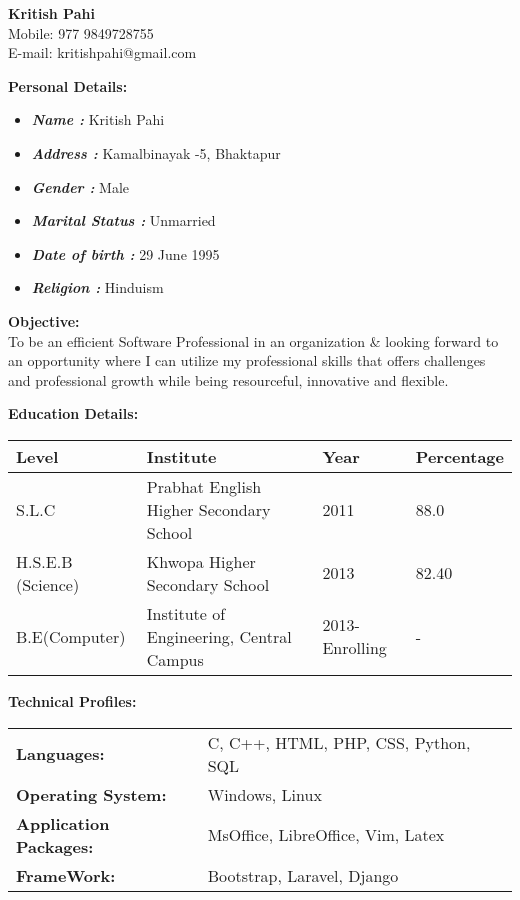 \documentclass[paper = a4paper, 12pt]{article}
\begin{document}
\pagestyle{empty}

{\Huge
	\textbf{Kritish Pahi} \\
	\small{Mobile: 977 9849728755}\\
	\small{E-mail: kritishpahi@gmail.com}\\

	
}

{ \Large \textbf{Personal Details:}\\
}
\begin{itemize}\addtolength{\leftskip}{8mm}

	\item \textbf{\emph{Name :}} Kritish Pahi
	\item \textbf{\emph{Address :}} Kamalbinayak -5, Bhaktapur
	\item \textbf{\emph{Gender :}} Male
	\item \textbf{\emph{Marital Status :}} Unmarried
	\item \textbf{\emph{Date of birth :}} 29 June 1995
	\item \textbf{\emph{Religion :}} Hinduism
\end{itemize}
\vspace{8mm}

{\Large \textbf{Objective:} \\
}
To be an efficient Software Professional in an organization \& looking forward
to an opportunity where I can utilize my professional skills that offers 
challenges and professional growth while being resourceful, innovative 
and flexible.

\vspace{8mm}
{\Large \textbf{ Education Details: } \\
}
\begin{tabular}{l l l l}
	\textbf{Level} & \textbf{Institute} &\textbf{Year} & \textbf{Percentage} \\ \hline
	S.L.C & Prabhat English Higher Secondary School & 2011 & 88.0 \\ \hline
	H.S.E.B (Science) & Khwopa Higher Secondary School & 2013 & 82.40 \\ \hline
	B.E(Computer) & Institute of Engineering, Central Campus & 2013-Enrolling & - \\ \hline
\end{tabular}

\vspace{8mm}
{\Large \textbf{ Technical Profiles: } \\
}
\begin{tabular}{l l}
	\textbf{Languages:} & C, C++, HTML, PHP, CSS, Python, SQL \\
	\textbf{Operating System:} & Windows, Linux \\
	\textbf{Application Packages:} & MsOffice, LibreOffice, Vim, Latex \\ 
	\textbf{FrameWork: } & Bootstrap, Laravel, Django \\
	
\end{tabular}
\end{document}

